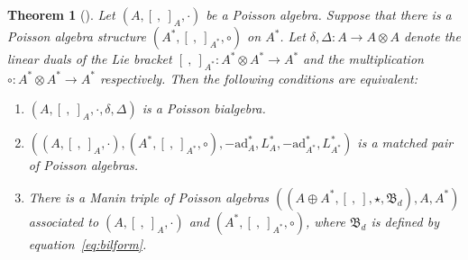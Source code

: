\documentclass[10pt,a4paper]{amsart}
\numberwithin{equation}{section}
\newtheorem{Theorem}{Theorem}[section]
\newcommand{\ad}{\mathrm{ad}}
\begin{document}
\begin{Theorem}[{\cite[structure Theorem~(II)]{ni2013poisson}}]\label{thm:poibieq}
 Let $(A, [\ ,\ ]_A, \cdot)$ be a Poisson algebra.
 Suppose that there is a Poisson algebra structure $(A^*, [\ ,\ ]_{A^*}, \circ)$ on $A^*$.
 Let $\delta, \Delta\colon A \to A \otimes A$ denote the linear duals of the Lie bracket $[\ ,\ ]_{A^*}\colon A^* \otimes A^* \to A^*$ and the multiplication $\circ\colon A^* \otimes A^* \to A^*$ respectively.
 Then the following conditions are equivalent:
 \begin{enumerate}\itemsep=0pt
 \item[$(1)$] $(A, [\ ,\ ]_A, \cdot, \delta, \Delta)$ is a Poisson bialgebra.
 \item[$(2)$] $((A, [\ ,\ ]_A, \cdot), (A^*, [\ ,\ ]_{A^*}, \circ), -\ad_{A}^*, L_{A}^*, -\ad_{A^*}^*, L_{A^*}^*)$ is a matched pair of Poisson algebras.
 \item[$(3)$] There is a Manin triple of Poisson algebras $((A \oplus A^*, [\ ,\ ], \star, \mathfrak{B}_d), A, A^*)$ associated to $(A, [\ ,\ ]_A, \cdot)$ and $(A^*, [\ ,\ ]_{A^*}, \circ)$, where $\mathfrak{B}_d$ is defined by equation~\eqref{eq:bilform}.
 \end{enumerate}
\end{Theorem}
\end{document}

